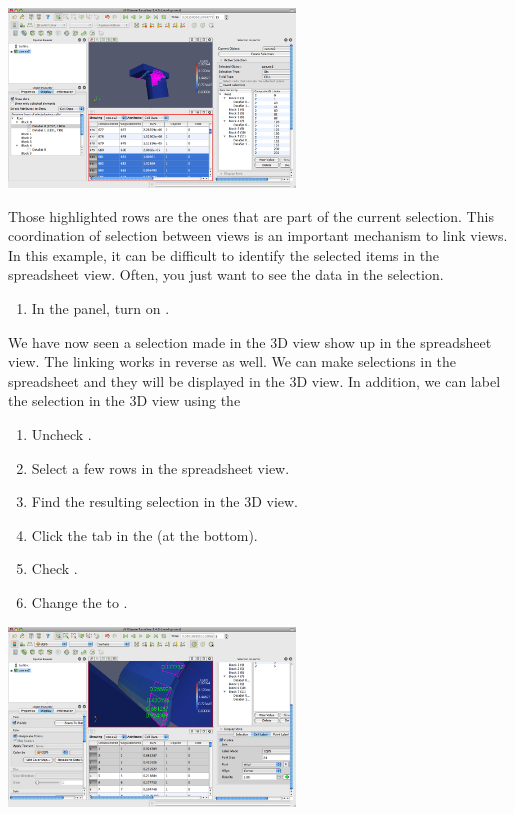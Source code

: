 \begin{inlinefig}
  \includegraphics[width=3in]{images/SpreadsheetViewExample}
\end{inlinefig}

Those highlighted rows are the ones that are part of the current
selection.  This coordination of selection between views is an important
mechanism to link views.  In this example, it can be difficult to identify
the selected items in the spreadsheet view.  Often, you just want to see
the data in the selection.

\begin{enumerate}
  \restorecounter
\item In the  panel, turn on .
\end{enumerate}

We have now seen a selection made in the 3D view show up in the spreadsheet
view.  The linking works in reverse as well.  We can make selections in the
spreadsheet and they will be displayed in the 3D view.  In addition, we can
label the selection in the 3D view using the 

\begin{enumerate}
\item Uncheck .
\item Select a few rows in the spreadsheet view.
\item Find the resulting selection in the 3D view.
\item Click the  tab in the  (at
  the bottom).
\item Check .
\item Change the  to .
\end{enumerate}

\begin{inlinefig}
  \includegraphics[width=3in]{images/SpreadsheetSelection}
\end{inlinefig}

